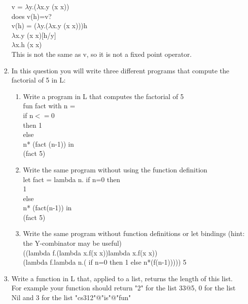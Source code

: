 \documentclass[11pt]{article}
\begin{document}
\begin{enumerate}
v = $\lambda$y.($\lambda$x.y (x x))\\
does v(h)=v?\\
v(h) = ($\lambda$y.($\lambda$x.y (x x)))h\\
$\lambda$x.y (x x)[h/y]\\
$\lambda$x.h (x x)\\
This is not the same as v, so it is not a fixed point operator.\\

\item In this question you will write three different programs that compute the factorial of 5 in L:\\

\begin{enumerate}
\item Write a program in L that computes the factorial of 5\\

fun fact with n = \\
if n$<=$0 \\
then 1 \\
else \\
n* (fact (n-1)) in\\ 
(fact 5)\\

\item Write the same program without using the function definition\\

let fact = lambda n. if n=0 then\\
1 \\
else \\
n* (fact(n-1)) in \\
(fact 5)\\

\item Write the same program without function definitions or let bindings (hint: the Y-combinator may be useful)\\

((lambda f.(lambda x.f(x x))lambda x.f(x x)) \\
(lambda f.lambda n.( if n=0 then 1 else n*(f(n-1))))) 5\\
\end{enumerate}
\item Write a function in L that, applied to a list, returns the length of this list. For example your function should return "2" for the list 33@5, 0 for the list Nil and 3 for the list "cs312"@"is"@"fun"\\


\end{enumerate}
\end{document}
